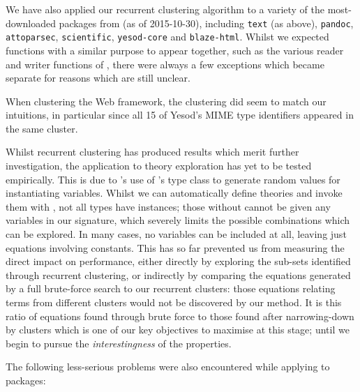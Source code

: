 We have also applied our recurrent clustering algorithm to a variety of the
most-downloaded packages from \hackage{} (as of 2015-10-30), including
\texttt{text} (as above), \texttt{pandoc}, \texttt{attoparsec},
\texttt{scientific}, \texttt{yesod-core} and \texttt{blaze-html}. Whilst we
expected functions with a similar purpose to appear together, such as the
various reader and writer functions of , there were always a few
exceptions which became separate for reasons which are still unclear.

When clustering the  Web framework, the clustering did seem to match
our intuitions, in particular since all 15 of Yesod's MIME type identifiers
appeared in the same cluster.

Whilst recurrent clustering has produced results which merit further
investigation, the application to theory exploration has yet to be tested
empirically. This is due to \quickspec{}'s use of \quickcheck{}'s  type
class to generate random values for instantiating variables. Whilst we can
automatically define \quickspec{} theories and invoke them with , not
all types have  instances; those without cannot be given any
variables in our signature, which severely limits the possible combinations
which can be explored. In many cases, no variables can be included at all,
leaving just equations involving constants. This has so far prevented us from
measuring the direct impact on \quickspec{} performance, either directly by
exploring the sub-sets identified through recurrent clustering, or indirectly by
comparing the equations generated by a full brute-force search to our recurrent
clusters: those equations relating terms from different clusters would not be
discovered by our method. It is this ratio of equations found through brute
force to those found after narrowing-down by clusters which is one of our key
objectives to maximise at this stage; until we begin to pursue the
\emph{interestingness} of the properties.

The following less-serious problems were also encountered while applying
\mlforhs{} to \hackage{} packages:

